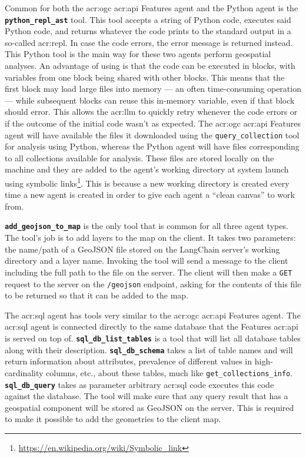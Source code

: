 Common for both the \acrshort{acr:ogc} \acrshort{acr:api} Features agent and the Python agent is the \textbf{\texttt{python\_repl\_ast}} tool. This tool accepts a string of Python code, executes said Python code, and returns whatever the code prints to the standard output in a so-called \acrfull{acr:repl}. In case the code errors, the error message is returned instead. This Python tool is the main way for these two agents perform geospatial analyses. An advantage of using  is that the code can be executed in blocks, with variables from one block being shared with other blocks. This means that the first block may load large files into memory --- an often time-consuming operation --- while subsequent blocks can reuse this in-memory variable, even if that block should error. This allows the \acrshort{acr:llm} to quickly retry whenever the code errors or if the outcome of the initial code wasn't as expected. The \acrshort{acr:ogc} \acrshort{acr:api} Features agent will have available the files it downloaded using the \texttt{query\_collection} tool for analysis using Python, whereas the Python agent will have files corresponding to all collections available for analysis. These files are stored locally on the machine and they are added to the agent's working directory at system launch using symbolic links\footnote{\url{https://en.wikipedia.org/wiki/Symbolic_link}}. This is because a new working directory is created every time a new agent is created in order to give each agent a \enquote{clean canvas} to work from.

\textbf{\texttt{add\_geojson\_to\_map}} is the only tool that is common for all three agent types. The tool's job is to add layers to the map on the client. It takes two parameters: the name/path of a GeoJSON file stored on the LangChain server's working directory and a layer name. Invoking the tool will send a message to the client including the full path to the file on the server. The client will then make a \texttt{GET} request to the server on the \texttt{/geojson} endpoint, asking for the contents of this file to be returned so that it can be added to the map.

The \acrshort{acr:sql} agent has tools very similar to the \acrshort{acr:ogc} \acrshort{acr:api} Features agent. The \acrshort{acr:sql} agent is connected directly to the same database that the Features \acrshort{acr:api} is served on top of. \textbf{\texttt{sql\_db\_list\_tables}} is a tool that will list all database tables along with their description. \textbf{\texttt{sql\_db\_schema}} takes a list of table names and will return information about attributes, prevalence of different values in high-cardinality columns, etc., about these tables, much like \texttt{get\_collections\_info}. \textbf{\texttt{sql\_db\_query}} takes as parameter arbitrary \acrshort{acr:sql} code executes this code against the database. The tool will make sure that any query result that has a geospatial component will be stored as GeoJSON on the server. This is required to make it possible to add the geometries to the client map.

